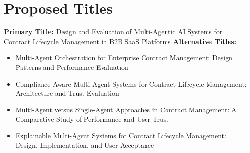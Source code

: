 
\section{Proposed Titles}\label{section:proposed_titles}

\textbf{Primary Title:} Design and Evaluation of Multi-Agentic AI Systems for Contract Lifecycle Management in B2B SaaS Platforms
\newline
\break
\textbf{Alternative Titles:}
\begin{itemize}
    \item Multi-Agent Orchestration for Enterprise Contract Management: Design Patterns and Performance Evaluation
    \item Compliance-Aware Multi-Agent Systems for Contract Lifecycle Management: Architecture and Trust Evaluation
    \item Multi-Agent versus Single-Agent Approaches in Contract Management: A Comparative Study of Performance and User Trust
    \item Explainable Multi-Agent Systems for Contract Lifecycle Management: Design, Implementation, and User Acceptance
\end{itemize}

